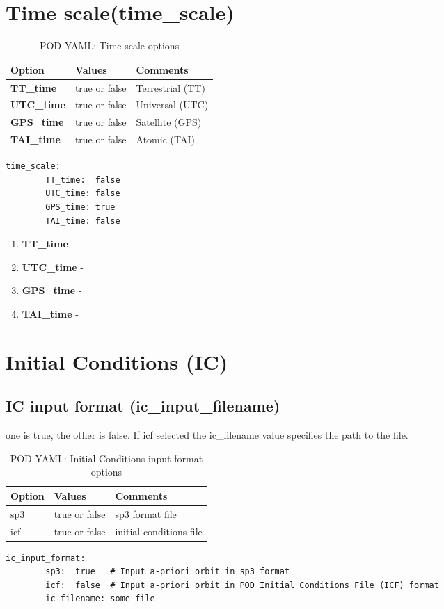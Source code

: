 \section{Time scale(time\_scale)}
%
\begin{table}[h!]
\begin{tabular}{|p{4.5cm}|p{2cm}|p{3.5cm}|}
\hline
Option & Values & Comments \\
\hline
\textbf{TT\_time} & true or false & Terrestrial (TT)\\
\textbf{UTC\_time} & true or false & Universal (UTC)\\
\textbf{GPS\_time} & true or false & Satellite (GPS)\\
\textbf{TAI\_time} & true or false & Atomic (TAI)\\
\hline
\end{tabular}
\caption{POD YAML: Time scale options}
\label{table:pod_yaml_time_scale_options}
\end{table}
%
\begin{lstlisting}[language=xml,caption=time\_scale yaml configuration example]
	time_scale:
		TT_time:  false
		UTC_time: false
		GPS_time: true
		TAI_time: false
\end{lstlisting}
%
\begin{enumerate}
	\item \textbf{TT\_time} - 
	\item \textbf{UTC\_time} - 
	\item \textbf{GPS\_time} - 
	\item \textbf{TAI\_time} -
\end{enumerate}
%
\section{Initial Conditions (IC)}
\subsection{IC input format (ic\_input\_filename)}
 one is true, the other is false. If icf selected the ic\_filename value specifies the path to the file.
\begin{table}[h!]
\begin{tabular}{|p{4.5cm}|p{2cm}|p{3.5cm}|}
	\hline
	Option & Values & Comments \\
	\hline
   sp3 & true or false & sp3 format file\\
   icf & true or false & initial conditions file\\
   \hline
\end{tabular}
\caption{POD YAML: Initial Conditions input format options}
\label{table:pod_yaml_ic_format}
\end{table}
%
\begin{lstlisting}[language=xml,caption=ic\_input\_format yaml configuration example]
 	ic_input_format:
		sp3:  true   # Input a-priori orbit in sp3 format
		icf:  false  # Input a-priori orbit in POD Initial Conditions File (ICF) format
		ic_filename: some_file
\end{lstlisting}
%
